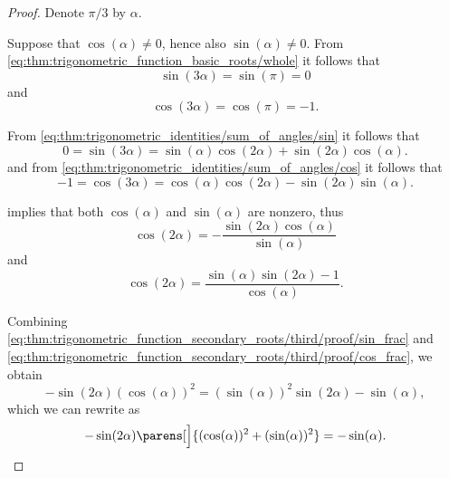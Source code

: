 \begin{proof}
   Denote \( \pi / 3 \) by \( \alpha \).

  Suppose that \( \cos(\alpha) \neq 0 \), hence also \( \sin(\alpha) \neq 0 \). From \eqref{eq:thm:trigonometric_function_basic_roots/whole} it follows that
  \begin{equation*}
    \sin(3\alpha) = \sin(\pi) = 0
  \end{equation*}
  and
  \begin{equation*}
    \cos(3\alpha) = \cos(\pi) = -1.
  \end{equation*}

  From \eqref{eq:thm:trigonometric_identities/sum_of_angles/sin} it follows that
  \begin{equation*}
    0 = \sin(3\alpha) = \sin(\alpha) \cos(2\alpha) + \sin(2\alpha) \cos(\alpha).
  \end{equation*}
  and from \eqref{eq:thm:trigonometric_identities/sum_of_angles/cos} it follows that
  \begin{equation*}
    -1 = \cos(3\alpha) = \cos(\alpha) \cos(2\alpha) - \sin(2\alpha) \sin(\alpha).
  \end{equation*}

   implies that both \( \cos(\alpha) \) and \( \sin(\alpha) \) are nonzero, thus
  \begin{equation}\label{eq:thm:trigonometric_function_secondary_roots/third/proof/sin_frac}
    \cos(2\alpha)
    =
    - \frac {\sin(2\alpha) \cos(\alpha)} {\sin(\alpha)}
  \end{equation}
  and
  \begin{equation}\label{eq:thm:trigonometric_function_secondary_roots/third/proof/cos_frac}
    \cos(2\alpha)
    =
    \frac {\sin(\alpha) \sin(2\alpha) - 1} {\cos(\alpha)}.
  \end{equation}

  Combining \eqref{eq:thm:trigonometric_function_secondary_roots/third/proof/sin_frac} and \eqref{eq:thm:trigonometric_function_secondary_roots/third/proof/cos_frac}, we obtain
  \begin{equation*}
    - \sin(2\alpha) (\cos(\alpha))^2 = (\sin(\alpha))^2 \sin(2\alpha) - \sin(\alpha),
  \end{equation*}
  which we can rewrite as
  \begin{equation*}
    - \sin(2\alpha) \parens[\Big]{ (\cos(\alpha))^2 + (\sin(\alpha))^2 } = - \sin(\alpha).
  \end{equation*}


\end{proof}
